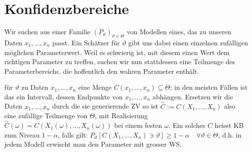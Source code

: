
\section{Konfidenzbereiche}
Wir suchen aus einer Familie $(P_\vartheta)_{\vartheta \in \Theta}$ von Modellen eines, das zu unseren Daten $x_1, \dots, x_n$ passt. Ein Schätzer für $\vartheta$ gibt uns dabei einen einzelnen zufälligen möglichen Parameterwert. Weil es schwierig ist, mit diesem einen Wert dem richtigen Parameter zu treffen, suchen wir nun stattdessen eine Teilmenge des Parameterbereichs, die hoffentlich den wahren Parameter enthält.
\begin{itemize}
     für $\vartheta$ zu Daten $x_1, \dots, x_n$ eine Menge $C(x_1, \dots, x_n) \subseteq \Theta$; in den meisten Fällen ist das ein Intervall, dessen Endpunkte von $x_1, \dots, x_n$ abhängen. Ersetzen wir die Daten $x_1, \dots, x_n$ durch die sie generierende ZV so ist $\overset{\sim}{C} := C(X_1, \dots, X_n)$ also eine zufällige Teilmenge von $\Theta$, mit Realisierung $\overset{\sim}{C}(\omega) = C(X_1(\omega), \dots, X_n(\omega))$ bei einem festen $\omega$. Ein solches $C$ heisst KB zum Niveau $1 - \alpha$, falls gilt: $P_\vartheta[C(X_1, \dots, X_n) \ni \vartheta] \ge 1 - \alpha \quad \forall \vartheta \in \Theta$, d.h. in jedem Modell erwischt man den Parameter mit grosser WS.
\end{itemize}

